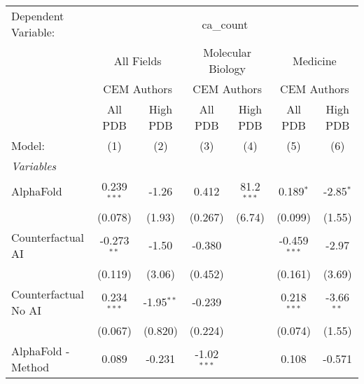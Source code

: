 \begingroup
\centering
\begin{tabular}{lcccccc}
   \tabularnewline \midrule \midrule
   Dependent Variable: & \multicolumn{6}{c}{ca\_count}\\
 & \multicolumn{2}{c}{All Fields} & \multicolumn{2}{c}{Molecular Biology} & \multicolumn{2}{c}{Medicine} \\
\cmidrule(lr){2-3} \cmidrule(lr){4-5} \cmidrule(lr){6-7}
 & \multicolumn{2}{c}{CEM Authors} & \multicolumn{2}{c}{CEM Authors} & \multicolumn{2}{c}{CEM Authors} \\
\cmidrule(lr){2-3} \cmidrule(lr){4-5} \cmidrule(lr){6-7}
 & \multicolumn{1}{c}{All PDB} & \multicolumn{1}{c}{High PDB} & \multicolumn{1}{c}{All PDB} & \multicolumn{1}{c}{High PDB} & \multicolumn{1}{c}{All PDB} & \multicolumn{1}{c}{High PDB} \\
\cmidrule(lr){2-2} \cmidrule(lr){3-3} \cmidrule(lr){4-4} \cmidrule(lr){5-5} \cmidrule(lr){6-6} \cmidrule(lr){7-7}
   Model:                                                     & (1)           & (2)          & (3)           & (4)          & (5)            & (6)\\  
   \midrule
   \emph{Variables}\\
   AlphaFold                                                  & 0.239$^{***}$ & -1.26        & 0.412         & 81.2$^{***}$ & 0.189$^{*}$    & -2.85$^{*}$\\   
                                                              & (0.078)       & (1.93)       & (0.267)       & (6.74)       & (0.099)        & (1.55)\\   
   Counterfactual AI                                          & -0.273$^{**}$ & -1.50        & -0.380        &              & -0.459$^{***}$ & -2.97\\   
                                                              & (0.119)       & (3.06)       & (0.452)       &              & (0.161)        & (3.69)\\   
   Counterfactual No AI                                       & 0.234$^{***}$ & -1.95$^{**}$ & -0.239        &              & 0.218$^{***}$  & -3.66$^{**}$\\   
                                                              & (0.067)       & (0.820)      & (0.224)       &              & (0.074)        & (1.55)\\   
   AlphaFold - Method                                         & 0.089         & -0.231       & -1.02$^{***}$ &              & 0.108          & -0.571\\   

\end{tabular}
